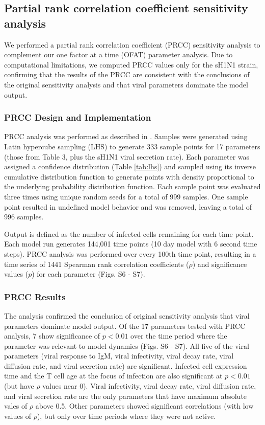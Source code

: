 \documentclass[preprint,10pt,authoryear]{article}
\begin{document}
\subsection{Partial rank correlation coefficient sensitivity analysis}

We performed a partial rank correlation coefficient (PRCC) sensitivity analysis to complement our one factor at a time (OFAT) parameter analysis.  Due to computational limitations, we computed PRCC values only for the sH1N1 strain, confirming that the results of the PRCC are consistent with the conclusions of the original sensitivity analysis and that viral parameters dominate the model output.

\subsubsection{PRCC Design and Implementation}

PRCC analysis was performed as described in \cite{Marino2008}.  Samples were generated using Latin hypercube sampling (LHS) to generate 333 sample points for 17 parameters (those from Table 3, plus the sH1N1 viral secretion rate).  Each parameter was assigned a confidence distribution (Table \ref{tab:lhs}) and sampled using its inverse cumulative distribution function to generate points with density proportional to the underlying probability distribution function.  Each sample point was evaluated three times using unique random seeds for a total of 999 samples.  One sample point resulted in undefined model behavior and was removed, leaving a total of 996 samples.

Output is defined as the number of infected cells remaining for each time point.  Each model run generates 144,001 time points (10 day model with 6 second time steps).  PRCC analysis was performed over every 100th time point, resulting in a time series of 1441 Spearman rank correlation coefficients ($\rho$) and significance values ($p$) for each parameter (Figs. S6 - S7).

\subsubsection{PRCC Results}

The  analysis confirmed the conclusion of original sensitivity analysis that viral parameters dominate model output.  Of the 17 parameters tested with PRCC analysis, 7 show significance of $p < 0.01$ over the time period where the parameter was relevant to model dynamics (Figs. S6 - S7).  All five of the viral parameters (viral response to IgM, viral infectivity, viral decay rate, viral diffusion rate, and viral secretion rate) are significant.  Infected cell expression time and the T cell age at the focus of infection are also significant at $p < 0.01$ (but have $\rho$ values near 0).  Viral infectivity, viral decay rate, viral diffusion rate, and viral secretion rate are the only parameters that have maximum absolute vales of $\rho$ above 0.5.  Other parameters showed significant correlations (with low values of $\rho$), but only over time periods where they were not active.
\end{document}
